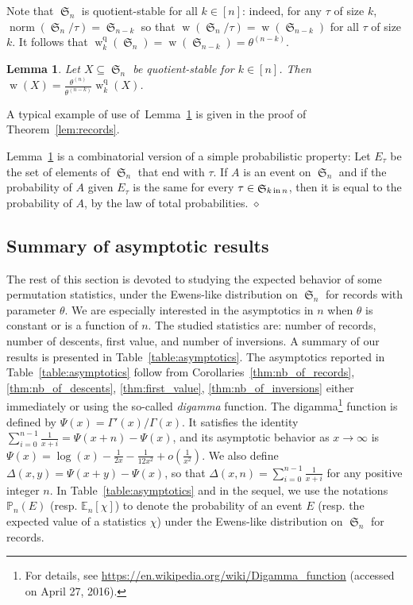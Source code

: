 \documentclass[proceedings]{aofa}
\newcommand{\EE}{\mathbb{E}}
\newcommand{\PP}{\mathbb{P}}
\newcommand{\wqotk}[2]{\weight^{\quotient}_{#1}(#2)}
\DeclareMathOperator{\sym}{\mathfrak{S}}
\DeclareMathOperator{\weight}{w}
\DeclareMathOperator{\quotient}{q}
\DeclareMathOperator{\norm}{norm}
\newcommand{\rfact}[2]{#1^{(#2)}}
\newcommand{\symin}[2]{\sym_{#1 \text{\,in\,} #2}}
\newtheorem{lemma}[theorem]{Lemma}
\newenvironment{remark}{\noindent{\bf Remark:} }{\hfill$\diamond$}
\begin{document}
Note that $\sym_n$ is quotient-stable for all $k  \in [n]$: 
indeed, for any $\tau$ of size $k$, $\norm(\sym_n/\tau) = \sym_{n-k}$ so that $\weight(\sym_n/\tau) = \weight(\sym_{n-k})$ for all $\tau$ of size $k$. 
It follows that $\wqotk{k}{\sym_n}= \weight(\sym_{n-k}) = \rfact \theta {n-k}$. 

\begin{lemma}\label{lem:qot}
Let $X\subseteq \sym_{n}$ be quotient-stable for $k \in [n]$. Then 
$\weight(X) = \frac{\rfact \theta n}{\rfact \theta {n-k}}\wqotk{k}{X}$.
\end{lemma}

A typical example of use of~Lemma~\ref{lem:qot} is given in the proof of Theorem~\ref{lem:records}.

\begin{remark}
Lemma~\ref{lem:qot} is a combinatorial version of a simple probabilistic property: Let $E_{\tau}$ be the set of elements of $\sym_{n}$ that end with $\tau$. If $A$ is an event on $\sym_{n}$ and if the probability of $A$ given $E_{\tau}$ is the same for every $\tau\in\symin{k}{n}$, then it is equal to the probability of $A$, by the law of total probabilities.
\end{remark}

\subsection{Summary of asymptotic results}

The rest of this section is devoted to studying the expected behavior of some permutation statistics, 
under the Ewens-like distribution on $\sym_n$ for records with parameter $\theta$. 
We are especially interested in the asymptotics in $n$ when $\theta$ is constant or is a function of $n$. 
The studied statistics are: number of records, number of descents, first value, and number of inversions. 
A summary of our results is presented in Table~\ref{table:asymptotics}. 
The asymptotics reported in Table~\ref{table:asymptotics} follow from Corollaries~\ref{thm:nb_of_records}, \ref{thm:nb_of_descents}, \ref{thm:first_value}, \ref{thm:nb_of_inversions} 
either immediately or using the so-called \emph{digamma} function. 
The digamma\footnote{For details, see \url{https://en.wikipedia.org/wiki/Digamma_function} (accessed on April 27, 2016).} function is defined by $\Psi(x)=\Gamma'(x)/\Gamma(x)$. 
It satisfies the identity $\sum_{i=0}^{n-1}\frac1{x + i} = \Psi(x + n)-\Psi(x)$, 
and its asymptotic behavior as $x\rightarrow\infty$ is $\Psi(x) = \log(x) - \frac{1}{2x} -\frac{1}{12x^2}  +  o\left(\frac{1}{x^2}\right)$. We also define $\Delta(x,y)=\Psi(x+y)-\Psi(x)$, so that $\Delta(x,n)=\sum_{i=0}^{n-1}\frac1{x + i}$ for any positive integer $n$.
In Table~\ref{table:asymptotics} and in the sequel,
we use the notations $\PP_{n}(E)$ (resp. $\EE_{n}[\chi]$) to denote 
the probability of an event $E$ (resp. the expected value of a statistics $\chi$)   
under the Ewens-like distribution on $\sym_n$ for records.
 
\end{document}
